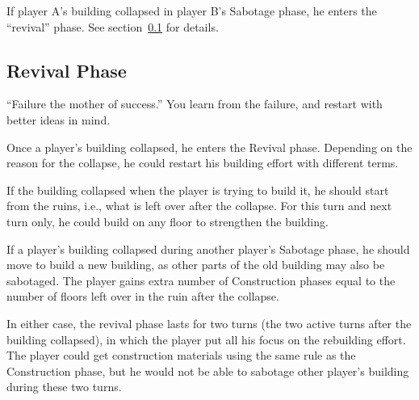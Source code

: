 \documentclass[a4paper, twocolumn, 12pt, twoside, english]{article}
\begin{document}
If player A's building collapsed in player B's Sabotage phase, he enters the ``revival'' phase. See section~\ref{sec:rev} for details.

\subsection{Revival Phase}
\label{sec:rev}
\begin{tcolorbox}
``Failure the mother of success.'' You learn from the failure, and restart with better ideas in mind.
\end{tcolorbox}
Once a player's building collapsed, he enters the Revival phase. Depending on the reason for the collapse, he could restart his building effort with different terms.

If the building collapsed when the player is trying to build it, he should start from the ruins, i.e., what is left over after the collapse. For this turn and next turn only, he could build on any floor to strengthen the building.

If a player's building collapsed during another player's Sabotage phase, he should move to build a new building, as other parts of the old building may also be sabotaged. The player gains extra number of Construction phases equal to the number of floors left over in the ruin after the collapse. 

In either case, the revival phase lasts for two turns (the two active turns after the building collapsed), in which the player put all his focus on the rebuilding effort. The player could get construction materials using the same rule as the Construction phase, but he would not be able to sabotage other player's building during these two turns.
\end{document}
